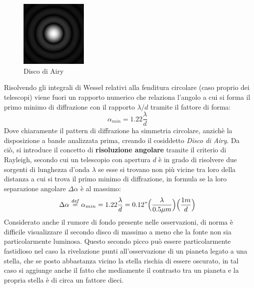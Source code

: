 \begin{figure}
	\vspace{-15pt}
	\centering
	\includegraphics[width=0.29\textwidth]{Immagini/Capitolo2/Disco_Airy.PNG}
	\caption*{Disco di Airy}
	\vspace{-15pt}
\end{figure}

Risolvendo gli integrali di Wessel relativi alla fenditura circolare (caso proprio dei telescopi) viene fuori un rapporto numerico che relaziona l'angolo a cui si forma il primo minimo di diffrazione con il rapporto $\lambda/d$ tramite il fattore di forma:
\begin{equation}
	\label{eq:diff-Airy}
	\alpha_{min}=1.22\frac{\lambda}{d}
\end{equation}
Dove chiaramente il pattern di diffrazione ha simmetria circolare, anzichè la disposizione a bande analizzata prima, creando il cosiddetto \textit{Disco di Airy}. Da ciò, si introduce il concetto di \textbf{risoluzione angolare} tramite il criterio di Rayleigh, secondo cui un telescopio con apertura $d$ è in grado di risolvere due sorgenti di lunghezza d'onda $\lambda$ se esse si trovano non più vicine tra loro della distanza a cui si trova il primo minimo di diffrazione, in formula se la loro separazione angolare $\Delta\alpha$ è al massimo:
\begin{equation}
	\label{def:ris-ang}
	\Delta\alpha \overset{\mathit{def}}{=} \alpha_{min} = 1.22\frac{\lambda}{d} =
	0.12" \Bigl( \frac{\lambda}{0.5\mu m} \Bigr) \Bigl( \frac{1m}{d} \Bigr)
\end{equation}
Considerato anche il rumore di fondo presente nelle osservazioni, di norma è difficile visualizzare il secondo disco di massimo a meno che la fonte non sia particolarmente luminosa. Questo secondo picco può essere particolarmente fastidioso nel caso la rivelazione punti all'osservazione di un pianeta legato a una stella, che se posto abbastanza vicino la stella rischia di essere oscurato, in tal caso si aggiunge anche il fatto che mediamente il contrasto tra un pianeta e la propria stella è di circa un fattore dieci. 

